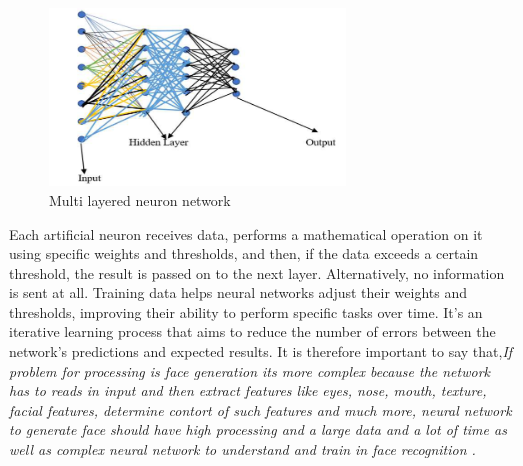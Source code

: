 \begin{figure}[h]
  \centering
  \includegraphics[width=0.7\textwidth]{images/deepNeural.PNG} 
  \caption{Multi layered neuron network \cite{negiDeepFakeUnderstanding2021}}
  \label{fig:your_label}
\end{figure}
Each artificial neuron receives data, performs a mathematical operation on it using specific weights and thresholds, and then, if the data exceeds a certain threshold, the result is passed on to the next layer. Alternatively, no information is sent at all. Training data helps neural networks adjust their weights and thresholds, improving their ability to perform specific tasks over time. It's an iterative learning process that aims to reduce the number of errors between the network's predictions and expected results.
It is therefore important to say that,\emph{If problem for processing is face generation its more complex because the network has to reads in input and then extract features like eyes, nose, mouth, texture, facial features, determine contort of such features and much more, neural network to generate face should have high processing and a large data and a lot of time as well as complex neural network to understand and train in face recognition \cite{negiDeepFakeUnderstanding2021}.}
